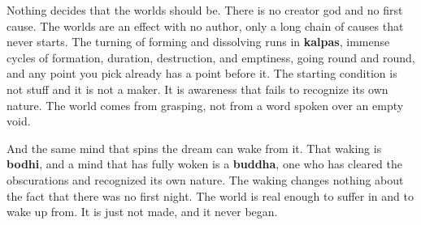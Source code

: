 Nothing decides that the worlds should be. There is no creator god and no first
cause. The worlds are an effect with no author, only a long chain of causes that
never starts. The turning of forming and dissolving runs in \textbf{kalpas}, immense
cycles of formation, duration, destruction, and emptiness, going round and round,
and any point you pick already has a point before it. The starting condition is not
stuff and it is not a maker. It is awareness that fails to recognize its own nature.
The world comes from grasping, not from a word spoken over an empty void.

And the same mind that spins the dream can wake from it. That waking is
\textbf{bodhi}, and a mind that has fully woken is a \textbf{buddha}, one who has
cleared the obscurations and recognized its own nature. The waking changes nothing
about the fact that there was no first night. The world is real enough to suffer in
and to wake up from. It is just not made, and it never began.
